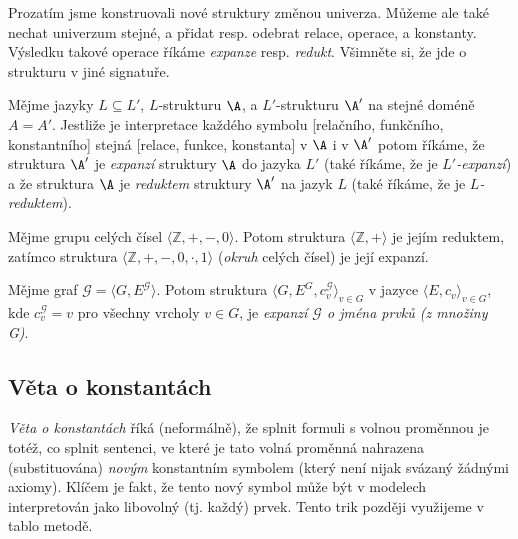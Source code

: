 Prozatím jsme konstruovali nové struktury změnou univerza. Můžeme ale také nechat univerzum stejné, a přidat resp. odebrat relace, operace, a konstanty. Výsledku takové operace říkáme \emph{expanze} resp. \emph{redukt}. Všimněte si, že jde o strukturu v jiné signatuře.

\begin{definition}
    Mějme jazyky $L\subseteq L'$, $L$-strukturu $\A$, a $L'$-strukturu $\A'$ na stejné doméně $A=A'$. Jestliže je interpretace každého symbolu [relačního, funkčního, konstantního] stejná [relace, funkce, konstanta] v $\A$ i v $\A'$ potom říkáme, že struktura $\A'$ je \emph{expanzí} struktury $\A$ do jazyka $L'$ (také říkáme, že je \emph{$L'$-expanzí}) a že struktura $\A$ je \emph{reduktem} struktury $\A'$ na jazyk $L$ (také říkáme, že je \emph{$L$-reduktem}).    
\end{definition}

\begin{example}
    Mějme grupu celých čísel $\langle\mathbb Z,+,-,0\rangle$. Potom struktura $\langle \mathbb Z,+\rangle$ je jejím reduktem, zatímco struktura $\langle\mathbb Z,+,-,0,\cdot,1\rangle$ (\emph{okruh} celých čísel) je její expanzí.
\end{example}

\begin{example}
    Mějme graf $\mathcal G=\langle G, E^\mathcal G\rangle$. Potom struktura $\langle G, E^G,c_v^\mathcal G\rangle_{v\in G}$ v jazyce $\langle E,c_v\rangle_{v\in G}$, kde $c_v^\mathcal G=v$ pro všechny vrcholy $v\in G$, je \emph{expanzí $\mathcal G$ o jména prvků (z množiny G)}.
\end{example}


\subsection{Věta o konstantách}

\emph{Věta o konstantách} říká (neformálně), že splnit formuli s volnou proměnnou je totéž, co splnit sentenci, ve které je tato volná proměnná nahrazena (substituována) \emph{novým} konstantním symbolem (který není nijak svázaný žádnými axiomy). Klíčem je fakt, že tento nový symbol může být v modelech interpretován jako libovolný (tj. každý) prvek. Tento trik později využijeme v tablo metodě.

